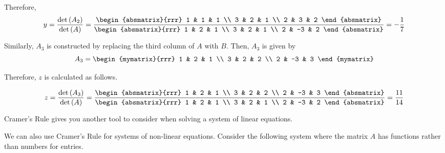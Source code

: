 \begin{solution}
Therefore, 
\begin{equation*}
y=\vspace{0.05in}\frac{\det \tup{A_{2}}}{\det \tup{A}} = \vspace{0.05in}\frac{\begin{absmatrix}{rrr}
1 & 1 & 1 \\
3 & 2 & 1 \\
2 & 3 & 2
\end{absmatrix} }{\begin{absmatrix}{rrr}
1 & 2 & 1 \\
3 & 2 & 1 \\
2 & -3 & 2
\end{absmatrix} }=-\vspace{0.05in}\frac{1}{7}
\end{equation*}

Similarly, $A_3$ is constructed by replacing the third column of $A$ with $B$. Then, $A_3$ is given by
\begin{equation*}
A_3
=
\begin{mymatrix}{rrr}
1 & 2 & 1 \\
3 & 2 & 2 \\
2 & -3 & 3
\end{mymatrix}
\end{equation*}

Therefore, $z$ is calculated as follows. 

\begin{equation*}
z=
\vspace{0.05in}\frac{\det \tup{A_{3}}}{\det \tup{A}}
=
\frac{\begin{absmatrix}{rrr}
1 & 2 & 1 \\
3 & 2 & 2 \\
2 & -3 & 3
\end{absmatrix} }{\begin{absmatrix}{rrr}
1 & 2 & 1 \\
3 & 2 & 1 \\
2 & -3 & 2
\end{absmatrix} }=\frac{11}{14}
\end{equation*}
\end{solution}

Cramer's Rule gives you another tool to consider when solving a system of linear equations.

We can also use Cramer's Rule for systems of non-linear equations. Consider the following system 
where the matrix $A$ has functions rather than numbers for entries. 

